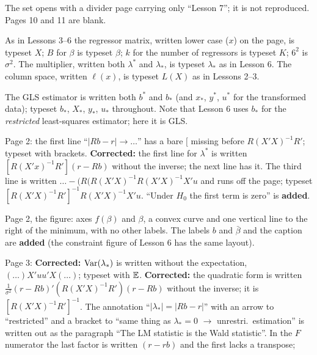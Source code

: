 \documentclass[11pt]{article}
\begin{document}
\begin{transcriptnotes}
  \item The set opens with a divider page carrying only ``Lesson 7''; it is not
        reproduced. Pages 10 and 11 are blank.
  \item As in Lessons 3--6 the regressor matrix, written lower case ($x$) on the
        page, is typeset $X$; $B$ for $\beta$ is typeset $\beta$; $k$ for the number
        of regressors is typeset $K$; $6^{2}$ is $\sigma^{2}$. The multiplier,
        written both $\lambda^{*}$ and $\lambda_{*}$, is typeset $\lambda_{*}$ as in
        Lesson 6. The column space, written $\ell(x)$, is typeset $L(X)$ as in
        Lessons 2--3.
  \item The GLS estimator is written both $b^{*}$ and $b_{*}$ (and $x_{*}$,
        $y^{*}$, $u^{*}$ for the transformed data); typeset $b_{*}$, $X_{*}$,
        $y_{*}$, $u_{*}$ throughout. Note that Lesson 6 uses $b_{*}$ for the
        \emph{restricted} least-squares estimator; here it is GLS.
  \item Page 2: the first line ``$|Rb - r| \to \ldots$'' has a bare $[$ missing
        before $R(X'X)^{-1}R'$; typeset with brackets. \textbf{Corrected:} the
        first line for $\lambda^{*}$ is written $[R(X'x)^{-1}R'](r - Rb)$ without
        the inverse; the next line has it. The third line is written
        $\ldots - (R(R(X'X)^{-1}R(X'X)^{-1}X'u$ and runs off the page; typeset
        $[R(X'X)^{-1}R']^{-1}R(X'X)^{-1}X'u$. ``Under $H_{0}$ the first term is
        zero'' is \textbf{added}.
  \item Page 2, the figure: axes $f(\beta)$ and $\beta$, a convex curve and one
        vertical line to the right of the minimum, with no other labels. The labels
        $b$ and $\bar\beta$ and the caption are \textbf{added} (the constraint
        figure of Lesson 6 has the same layout).
  \item Page 3: \textbf{Corrected:} $\operatorname{Var}(\lambda_{*})$ is written without the
        expectation, $(\ldots)X'uu'X(\ldots)$; typeset with $\mathbb{E}$. \textbf{Corrected:}
        the quadratic form is written
        $\tfrac{1}{\sigma^{2}}(r - Rb)'(R(X'X)^{-1}R')(r - Rb)$ without the inverse;
        it is $[R(X'X)^{-1}R']^{-1}$. The annotation ``$|\lambda_{*}| = |Rb - r|$''
        with an arrow to ``restricted'' and a bracket to ``same thing as
        $\lambda_{*} = 0$ $\to$ unrestri.\ estimation'' is written out as the
        paragraph ``The LM statistic is the Wald statistic''. In the $F$ numerator
        the last factor is written $(r - rb)$ and the first lacks a transpose;

\end{transcriptnotes}
\end{document}
